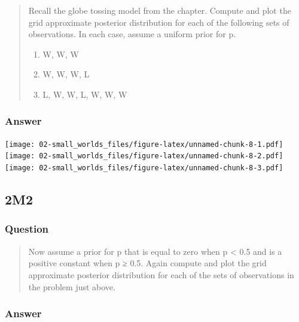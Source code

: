 \documentclass[
]{book}
\providecommand{\tightlist}{%
  \setlength{\itemsep}{0pt}\setlength{\parskip}{0pt}}
\begin{document}
\begin{quote}
Recall the globe tossing model from the chapter. Compute and plot the grid approximate posterior distribution for each of the following sets of observations. In each case, assume a uniform prior for p.~

\begin{enumerate}
\def\labelenumi{(\arabic{enumi})}
\tightlist
\item
  W, W, W
\item
  W, W, W, L
\item
  L, W, W, L, W, W, W
\end{enumerate}
\end{quote}

\hypertarget{answer-4}{%
\subsubsection*{Answer}\label{answer-4}}

\texttt{[image: 02-small\_worlds\_files/figure-latex/unnamed-chunk-8-1.pdf]} \texttt{[image: 02-small\_worlds\_files/figure-latex/unnamed-chunk-8-2.pdf]} \texttt{[image: 02-small\_worlds\_files/figure-latex/unnamed-chunk-8-3.pdf]}

\hypertarget{m2}{%
\subsection*{2M2}\label{m2}}

\hypertarget{question-5}{%
\subsubsection*{Question}\label{question-5}}

\begin{quote}
Now assume a prior for p that is equal to zero when p \textless{} 0.5 and is a positive constant when p ≥ 0.5. Again compute and plot the grid approximate posterior distribution for each of the sets of observations in the problem just above.
\end{quote}

\hypertarget{answer-5}{%
\subsubsection*{Answer}\label{answer-5}}
\end{document}
